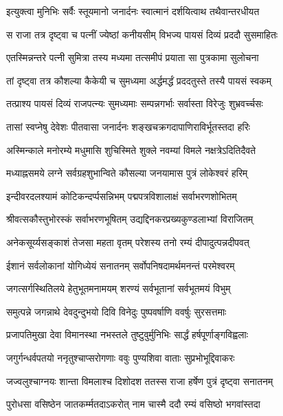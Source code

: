 
\twolineshloka
{इत्युक्त्वा मुनिभिः सर्वैः स्तूयमानो जनार्दनः}
{स्वात्मानं दर्शयित्वाथ तथैवान्तरधीयत}%

\twolineshloka
{स राजा तत्र दृष्ट्वा च पत्नीं ज्येष्ठां कनीयसीम्}
{विभज्य पायसं दिव्यं प्रददौ सुसमाहितः}%

\twolineshloka
{एतस्मिन्नन्तरे पत्नी सुमित्रा तस्य मध्यमा}
{तत्समीपं प्रयाता सा पुत्रकामा सुलोचना}%

\twolineshloka
{तां दृष्ट्वा तत्र कौशल्या कैकेयी च सुमध्यमा}
{अर्द्धमर्द्धं प्रददतुस्ते तस्यै पायसं स्वकम्}%

\twolineshloka
{तत्प्राश्य पायसं दिव्यं राजपत्न्यः सुमध्यमाः}
{सम्पन्नगर्भाः सर्वास्ता विरेजुः शुभ्रवर्च्चसः}%

\twolineshloka
{तासां स्वप्नेषु देवेशः पीतवासा जनार्दनः}
{शङ्खचक्रगदापाणिराविर्भूतस्तदा हरिः}%

\twolineshloka
{अस्मिन्काले मनोरम्ये मधुमासि शुचिस्मिते}
{शुक्ले नवम्यां विमले नक्षत्रेऽदितिदैवते}%

\twolineshloka
{मध्याह्नसमये लग्ने सर्वग्रहशुभान्विते}
{कौसल्या जनयामास पुत्रं लोकेश्वरं हरिम्}%

\twolineshloka
{इन्दीवरदलश्यामं कोटिकन्दर्प्पसन्निभम्}
{पद्मपत्रविशालाक्षं सर्वाभरणशोभितम्}%

\twolineshloka
{श्रीवत्सकौस्तुभोरस्कं सर्वाभरणभूषितम्}
{उद्यद्दिनकरप्रख्यकुण्डलाभ्यां विराजितम्}%

\twolineshloka
{अनेकसूर्य्यसङ्काशं तेजसा महता वृतम्}
{परेशस्य तनो रम्यं दीपादुत्पन्नदीपवत्}%

\twolineshloka
{ईशानं सर्वलोकानां योगिध्येयं सनातनम्}
{सर्वोपनिषदामर्थमनन्तं परमेश्वरम्}%

\twolineshloka
{जगत्सर्गस्थितिलये हेतुभूतमनामयम्}
{शरण्यं सर्वभूतानां सर्वभूतमयं विभुम्}%

\twolineshloka
{समुत्पन्ने जगन्नाथे देवदुन्दुभयो दिवि}
{विनेदुः पुष्पवर्षाणि ववर्षुः सुरसत्तमाः}%

\twolineshloka
{प्रजापतिमुखा देवा विमानस्था नभस्तले}
{तुष्टुवुर्मुनिभिः सार्द्धं हर्षपूर्णाङ्गविह्वलाः}%

\twolineshloka
{जगुर्गन्धर्वपतयो ननृतुश्चाप्सरोगणाः}
{ववुः पुण्यशिवा वाताः सुप्रभोभूद्दिवाकरः}%

\twolineshloka
{जज्वलुश्चाग्नयः शान्ता विमलाश्च दिशोदश}
{ततस्स राजा हर्षेण पुत्रं दृष्ट्वा सनातनम्}%

\twolineshloka
{पुरोधसा वसिष्ठेन जातकर्म्मतदाऽकरोत्}
{नाम चास्मै ददौ रम्यं वसिष्ठो भगवांस्तदा}%

